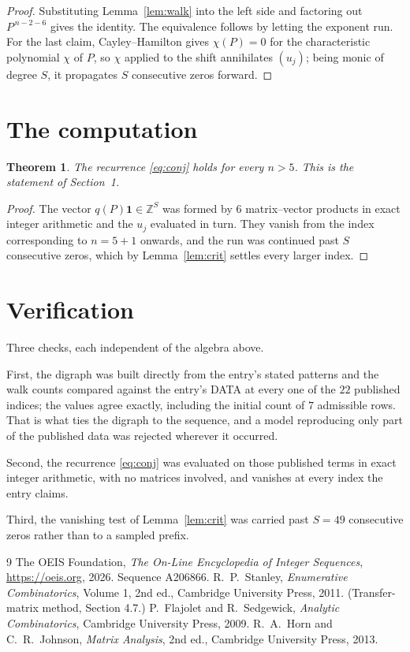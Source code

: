 \documentclass[11pt,a4paper]{article}
\theoremstyle{plain}
\newtheorem{theorem}{Theorem}
\theoremstyle{definition}
\begin{document}
\begin{proof}
Substituting Lemma~\ref{lem:walk} into the left side and factoring out
$P^{\,n-2-6}$ gives the identity. The equivalence follows by letting the exponent
run. For the last claim, Cayley--Hamilton gives $\chi(P)=0$ for the characteristic
polynomial $\chi$ of $P$, so $\chi$ applied to the shift annihilates $(u_j)$; being monic of
degree $S$, it propagates $S$ consecutive zeros forward.
\end{proof}

\section{The computation}

\begin{theorem}
The recurrence \eqref{eq:conj} holds for every $n>5$. This is the statement of
Section~1.
\end{theorem}

\begin{proof}
The vector $q(P)\mathbf{1}\in\mathbb{Z}^{S}$ was formed by $6$ matrix--vector
products in exact integer arithmetic and the $u_j$ evaluated in turn. They vanish from the
index corresponding to $n=5+1$ onwards, and the run was continued past $S$ consecutive
zeros, which by Lemma~\ref{lem:crit} settles every larger index.
\end{proof}

\section{Verification}

Three checks, each independent of the algebra above.

First, the digraph was built directly from the entry's stated patterns and the walk counts
compared against the entry's DATA at every one of the $22$ published indices; the
values agree exactly, including the initial count of $7$ admissible rows. That is
what ties the digraph to the sequence, and a model reproducing only part of the published
data was rejected wherever it occurred.

Second, the recurrence \eqref{eq:conj} was evaluated on those published terms in exact
integer arithmetic, with no matrices involved, and vanishes at every index the entry claims.

Third, the vanishing test of Lemma~\ref{lem:crit} was carried past $S=49$ consecutive
zeros rather than to a sampled prefix.

\begin{thebibliography}{9}
 The OEIS Foundation, \emph{The On-Line Encyclopedia of Integer
Sequences}, \url{https://oeis.org}, 2026. Sequence A206866.
 R.~P.~Stanley, \emph{Enumerative Combinatorics}, Volume 1, 2nd ed.,
Cambridge University Press, 2011. (Transfer-matrix method, Section 4.7.)
 P.~Flajolet and R.~Sedgewick, \emph{Analytic Combinatorics}, Cambridge
University Press, 2009.
 R.~A.~Horn and C.~R.~Johnson, \emph{Matrix Analysis}, 2nd ed., Cambridge
University Press, 2013.
\end{thebibliography}
\end{document}
